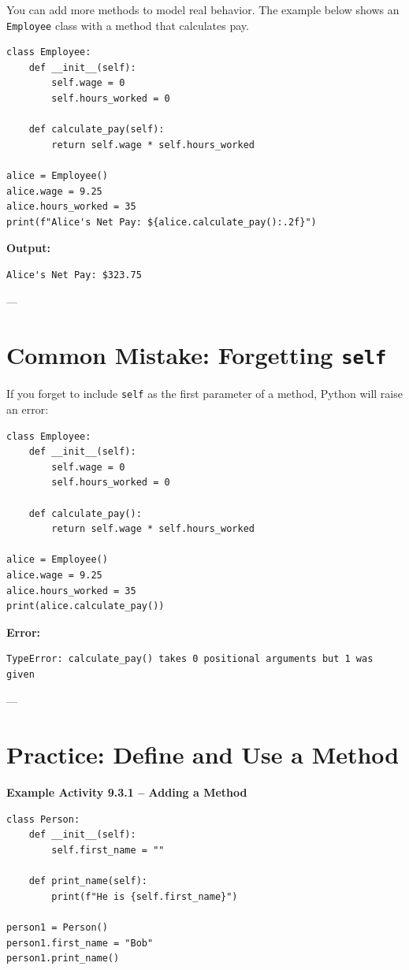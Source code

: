 You can add more methods to model real behavior.  
The example below shows an \texttt{Employee} class with a method that calculates pay.

\begin{verbatim}
class Employee:
    def __init__(self):
        self.wage = 0
        self.hours_worked = 0

    def calculate_pay(self):
        return self.wage * self.hours_worked

alice = Employee()
alice.wage = 9.25
alice.hours_worked = 35
print(f"Alice's Net Pay: ${alice.calculate_pay():.2f}")
\end{verbatim}

\textbf{Output:}
\begin{verbatim}
Alice's Net Pay: $323.75
\end{verbatim}

---

\section{Common Mistake: Forgetting \texttt{self}}

If you forget to include \texttt{self} as the first parameter of a method, Python will raise an error:

\begin{verbatim}
class Employee:
    def __init__(self):
        self.wage = 0
        self.hours_worked = 0

    def calculate_pay():
        return self.wage * self.hours_worked

alice = Employee()
alice.wage = 9.25
alice.hours_worked = 35
print(alice.calculate_pay())
\end{verbatim}

\textbf{Error:}
\begin{verbatim}
TypeError: calculate_pay() takes 0 positional arguments but 1 was given
\end{verbatim}

---

\section{Practice: Define and Use a Method}

\textbf{Example Activity 9.3.1 – Adding a Method}

\begin{verbatim}
class Person:
    def __init__(self):
        self.first_name = ""

    def print_name(self):
        print(f"He is {self.first_name}")

person1 = Person()
person1.first_name = "Bob"
person1.print_name()
\end{verbatim}


